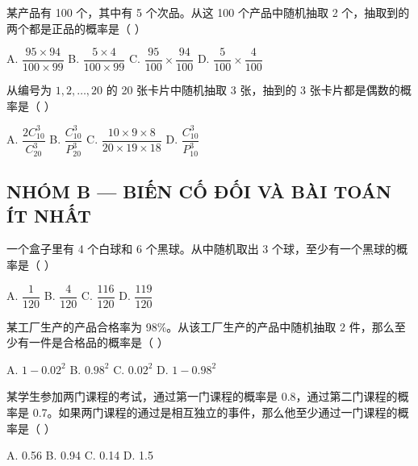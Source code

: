 \documentclass[11pt, a4paper]{article}
\begin{document}
\begin{baitap}[6]
某产品有 100 个，其中有 5 个次品。从这 100 个产品中随机抽取 2 个，抽取到的两个都是正品的概率是（ ）
\par\vspace{3pt}
\noindent A. $\dfrac{95 \times 94}{100 \times 99}$ \quad B. $\dfrac{5 \times 4}{100 \times 99}$ \quad C. $\dfrac{95}{100} \times \dfrac{94}{100}$ \quad D. $\dfrac{5}{100} \times \dfrac{4}{100}$
\end{baitap}

\begin{baitap}[7]
从编号为 $1,2,\ldots,20$ 的 20 张卡片中随机抽取 3 张，抽到的 3 张卡片都是偶数的概率是（ ）
\par\vspace{3pt}
\noindent A. $\dfrac{2C_{10}^3}{C_{20}^3}$ \quad B. $\dfrac{C_{10}^3}{P_{20}^3}$ \quad C. $\dfrac{10 \times 9 \times 8}{20 \times 19 \times 18}$ \quad D. $\dfrac{C_{10}^3}{P_{10}^3}$
\end{baitap}

\subsection*{NHÓM B — BIẾN CỐ ĐỐI VÀ BÀI TOÁN ÍT NHẤT}

\begin{baitap}[8]
一个盒子里有 4 个白球和 6 个黑球。从中随机取出 3 个球，至少有一个黑球的概率是（ ）
\par\vspace{3pt}
\noindent A. $\dfrac{1}{120}$ \quad B. $\dfrac{4}{120}$ \quad C. $\dfrac{116}{120}$ \quad D. $\dfrac{119}{120}$
\end{baitap}

\begin{baitap}[9]
某工厂生产的产品合格率为 98\%。从该工厂生产的产品中随机抽取 2 件，那么至少有一件是合格品的概率是（ ）
\par\vspace{3pt}
\noindent A. $1 - 0.02^2$ \quad B. $0.98^2$ \quad C. $0.02^2$ \quad D. $1 - 0.98^2$
\end{baitap}

\begin{baitap}[10]
某学生参加两门课程的考试，通过第一门课程的概率是 0.8，通过第二门课程的概率是 0.7。如果两门课程的通过是相互独立的事件，那么他至少通过一门课程的概率是（ ）
\par\vspace{3pt}
\noindent A. 0.56 \quad B. 0.94 \quad C. 0.14 \quad D. 1.5
\end{baitap}
\end{document}
